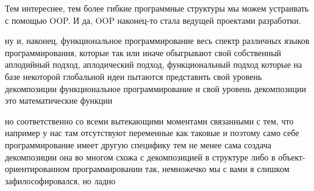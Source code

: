 Тем интереснее, тем более гибкие программные структуры мы можем устраивать с помощью OOP. И да, OOP наконец-то стала ведущей проектами разработки.

ну и, наконец, функциональное программирование весь спектр различных языков программирования, которые так или иначе обыгрывают свой собственный аплодийный подход, аплодический подход, функциональный подход которые на базе некоторой глобальной идеи пытаются представить свой уровень декомпозиции функциональное программирование и свой уровень декомпозиции это математические функции

но соответственно со всеми вытекающими моментами связанными с тем, что например у нас там отсутствуют переменные как таковые и поэтому само себе программирование имеет другую специфику тем не менее сама создача декомпозиции она во многом схожа с декомпозицией в структуре либо в объект-ориентированном программировании так, немножечко мы с вами я слишком зафилософировался, но ладно

